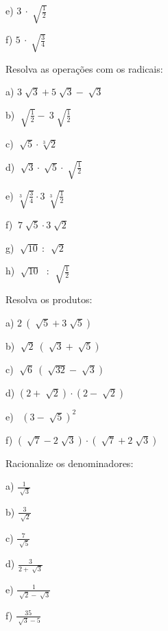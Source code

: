 \begin{exercicios}
\begin{multicols}{6}
	e)  \( 3~ \cdot   \sqrt[]{\frac{1}{2}} \)
	
	f)  \( 5~ \cdot   \sqrt[]{\frac{3}{4}} \) 
	\end{multicols}
	\exitem{} Resolva as operações com os radicais:
	\begin{multicols}{4}
		a)  \( 3 \sqrt[]{3}+5\sqrt[]{3}-\sqrt[]{3} \) 
		
		b)  \( \sqrt[]{\frac{1}{2}}-~3  \sqrt[]{\frac{1}{2}} \)
		
		c)  \( \sqrt[]{5}  \cdot  \sqrt[3]{2} \)
		
		d)  \( \sqrt[]{3}  \cdot  \sqrt[]{5} \cdot \sqrt[]{\frac{1}{2}} \)
		
		e)  \( \sqrt[3]{\frac{3}{4}} \cdot 3~ \sqrt[3]{\frac{1}{2}} \)
		
		f)  \( ~7 \sqrt[]{5}  \cdot  3 \sqrt[]{2} \)
		
		g)  \( \sqrt[]{10}~:~\sqrt[]{2} \)
		
		h)  \( \sqrt[]{10}\text{~ : }\sqrt[]{\frac{1}{2}} \) 
\end{multicols}
	\exitem{} Resolva os produtos:

\begin{multicols}{2}
	a) \( 2~ \left( \sqrt[]{5}+3\sqrt[]{5} \right)  \)
	
	b)  \( \sqrt[]{2}~ \left( \sqrt[]{3}+\sqrt[]{5} \right)  \)
	
	c)  \( \sqrt[]{6}~ \left( \sqrt[]{32}-\sqrt[]{3} \right)  \)
	
	d)  \(  \left( 2+\sqrt[]{2} \right)  \cdot  \left( 2-\sqrt[]{2} \right)  \)
	
	e)~  \(  \left( 3-\sqrt[]{5} \right) ^{2} \)
	
	f)  \(  \left( \sqrt[]{7}-2\sqrt[]{3} \right)  \cdot  \left( \sqrt[]{7}+2\sqrt[]{3} \right)  \)
\end{multicols}

	\exitem{} Racionalize os denominadores:

\begin{multicols}{5}

	a) \( \frac{1}{\sqrt[]{3}} \)
	
	b)  \( \frac{3}{\sqrt[]{2}} \)
	
	c)  \( \frac{7}{\sqrt[]{5}} \)
	
	d)  \( \frac{3}{2+\sqrt[]{3}} \)
	
	e)  \( \frac{1}{\sqrt[]{2}-\sqrt[]{3}} \)
	
	f)  \( \frac{35}{\sqrt[]{3}-5} \)
\end{multicols}


\end{exercicios}
